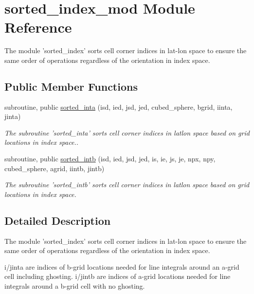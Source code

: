\section{sorted\-\_\-index\-\_\-mod Module Reference}
\label{classsorted__index__mod}


The module 'sorted\-\_\-index' sorts cell corner indices in lat-\/lon space to ensure the same order of operations regardless of the orientation in index space.  


\subsection*{Public Member Functions}
\begin{DoxyCompactItemize}
\item 
subroutine, public \hyperlink{classsorted__index__mod_abbcfc29e12a428c7bc771cdfa03cbc4e}{sorted\-\_\-inta} (isd, ied, jsd, jed, cubed\-\_\-sphere, bgrid, iinta, jinta)
\begin{DoxyCompactList}\small\item\em The subroutine 'sorted\-\_\-inta' sorts cell corner indices in latlon space based on grid locations in index space.. \end{DoxyCompactList}\item 
subroutine, public \hyperlink{classsorted__index__mod_abf73adcbd11fbcd52d4b8693471d6e12}{sorted\-\_\-intb} (isd, ied, jsd, jed, is, ie, js, je, npx, npy, cubed\-\_\-sphere, agrid, iintb, jintb)
\begin{DoxyCompactList}\small\item\em The subroutine 'sorted\-\_\-intb' sorts cell corner indices in latlon space based on grid locations in index space. \end{DoxyCompactList}\end{DoxyCompactItemize}


\subsection{Detailed Description}
The module 'sorted\-\_\-index' sorts cell corner indices in lat-\/lon space to ensure the same order of operations regardless of the orientation in index space. 

i/jinta are indices of b-\/grid locations needed for line integrals around an a-\/grid cell including ghosting. i/jintb are indices of a-\/grid locations needed for line integrals around a b-\/grid cell with no ghosting. 

